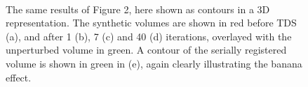   \begin{figure}[!t]
    \centering
    \\
    \caption{The same results of Figure 2, here shown as contours in a 3D representation. The synthetic volumes are shown in red before TDS (a), and after 1 (b), 7 (c) and 40 (d) iterations, overlayed with the unperturbed volume in green. A contour of the serially registered volume is shown in green in (e), again clearly illustrating the banana effect.}
    \label{fig:synthetic_contours}
  \end{figure}
